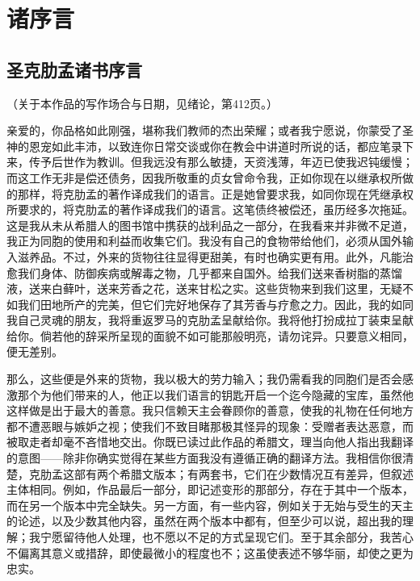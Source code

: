 
\chapter{诸序言}



\section{圣克肋孟诸书序言}

\par

（关于本作品的写作场合与日期，见绪论，第412页。）\par

亲爱的，你品格如此刚强，堪称我们教师的杰出荣耀；或者我宁愿说，你蒙受了圣神的恩宠如此丰沛，以致连你日常交谈或你在教会中讲道时所说的话，都应笔录下来，传予后世作为教训。但我远没有那么敏捷，天资浅薄，年迈已使我迟钝缓慢；而这工作无非是偿还债务，因我所敬重的贞女曾命令我，正如你现在以继承权所做的那样，将克肋孟的著作译成我们的语言。正是她曾要求我，如同你现在凭继承权所要求的，将克肋孟的著作译成我们的语言。这笔债终被偿还，虽历经多次拖延。这是我从未从希腊人的图书馆中携获的战利品之一部分，在我看来并非微不足道，我正为同胞的使用和利益而收集它们。我没有自己的食物带给他们，必须从国外输入滋养品。不过，外来的货物往往显得更甜美，有时也确实更有用。此外，凡能治愈我们身体、防御疾病或解毒之物，几乎都来自国外。给我们送来香树脂的蒸馏液，送来白藓叶，送来芳香之花，送来甘松之实。这些货物来到我们这里，无疑不如我们田地所产的完美，但它们完好地保存了其芳香与疗愈之力。因此，我的如同我自己灵魂的朋友，我将重返罗马的克肋孟呈献给你。我将他打扮成拉丁装束呈献给你。倘若他的辞采所呈现的面貌不如可能那般明亮，请勿诧异。只要意义相同，便无差别。\par

那么，这些便是外来的货物，我以极大的劳力输入；我仍需看我的同胞们是否会感激那个为他们带来的人，他正以我们语言的钥匙开启一个迄今隐藏的宝库，虽然他这样做是出于最大的善意。我只信赖天主会眷顾你的善意，使我的礼物在任何地方都不遭恶眼与嫉妒之视；使我们不致目睹那极其怪异的现象：受赠者表达恶意，而被取走者却毫不吝惜地交出。你既已读过此作品的希腊文，理当向他人指出我翻译的意图——除非你确实觉得在某些方面我没有遵循正确的翻译方法。我相信你很清楚，克肋孟这部有两个希腊文版本；有两套书，它们在少数情况互有差异，但叙述主体相同。例如，作品最后一部分，即记述变形的那部分，存在于其中一个版本，而在另一个版本中完全缺失。另一方面，有一些内容，例如关于无始与受生的天主的论述，以及少数其他内容，虽然在两个版本中都有，但至少可以说，超出我的理解；我宁愿留待他人处理，也不愿以不足的方式呈现它们。至于其余部分，我苦心不偏离其意义或措辞，即使最微小的程度也不；这虽使表述不够华丽，却使之更为忠实。\par

